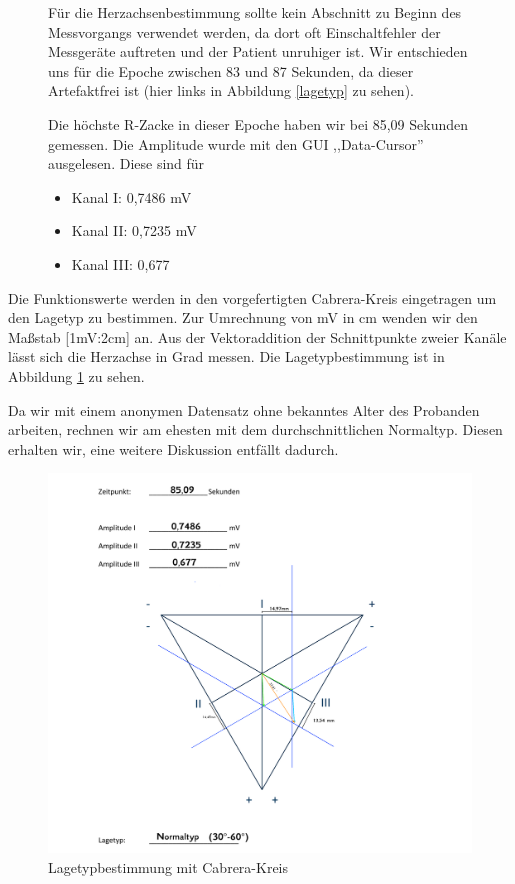 \documentclass[a4paper,12pt,titlepage]{scrartcl}
\begin{document}
\begin{figure}[ht]
\begin{minipage}[t]{0.5\linewidth}
        Für die Herzachsenbestimmung sollte kein Abschnitt zu Beginn des Messvorgangs verwendet werden, da dort oft Einschaltfehler der Messgeräte auftreten und der Patient unruhiger ist. Wir entschieden uns für die Epoche zwischen 83 und 87 Sekunden, da dieser Artefaktfrei ist (hier links in Abbildung \ref{lagetyp} zu sehen).

        Die höchste R-Zacke in dieser Epoche haben wir bei 85,09 Sekunden gemessen.
        Die Amplitude wurde mit den GUI ,,Data-Cursor'' ausgelesen. Diese sind für
        \begin{itemize}
            \item Kanal I: 0,7486 mV
            \item Kanal II: 0,7235 mV
            \item Kanal III: 0,677
        \end{itemize}
    \end{minipage}
\end{figure}

Die Funktionswerte werden in den vorgefertigten Cabrera-Kreis eingetragen um den Lagetyp zu bestimmen.
Zur Umrechnung von mV in cm wenden wir den Maßstab [1mV:2cm] an. Aus der Vektoraddition der Schnittpunkte zweier Kanäle lässt sich die Herzachse in Grad messen.
Die Lagetypbestimmung ist in Abbildung \ref{Lagetypbestimmung} zu sehen.

Da wir mit einem anonymen Datensatz ohne bekanntes Alter des Probanden arbeiten, rechnen wir am ehesten mit dem durchschnittlichen Normaltyp. Diesen erhalten wir, eine weitere Diskussion entfällt dadurch.

\begin{figure}[h]
    \caption{Lagetypbestimmung mit Cabrera-Kreis}
    \label{Lagetypbestimmung}
    \centering
    \includegraphics[width=\linewidth]{Assets/LaborBMT-Lagetyps.png}
\end{figure}
\end{document}
